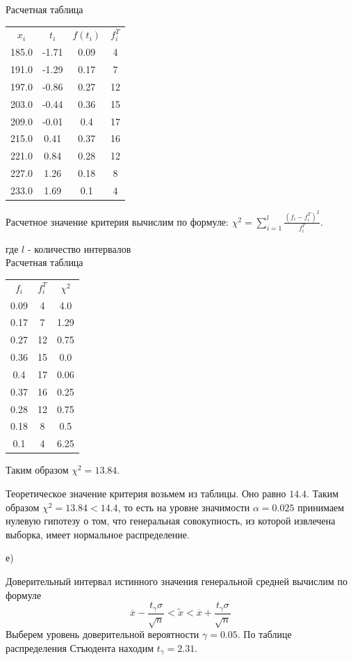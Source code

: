 \documentclass[10pt]{article}
\begin{document}
Расчетная таблица
\begin{center}
\begin{tabular}{ |c|c|c|c| }
\hline
$x_i$ & $t_i$ & $f(t_i)$ & $f_i^T$ \\
185.0 & -1.71 & 0.09 & 4 \\
191.0 & -1.29 & 0.17 & 7 \\
197.0 & -0.86 & 0.27 & 12 \\
203.0 & -0.44 & 0.36 & 15 \\
209.0 & -0.01 & 0.4 & 17 \\
215.0 & 0.41 & 0.37 & 16 \\
221.0 & 0.84 & 0.28 & 12 \\
227.0 & 1.26 & 0.18 & 8 \\
233.0 & 1.69 & 0.1 & 4 \\
\hline
\end{tabular}
\end{center}

Расчетное значение критерия вычислим по формуле:
$\chi^2=\sum_{i=1}^l\frac{(f_i-f^T_i)^2}{f_i^T}$.

где $l$ - количество интервалов\\

Расчетная таблица
\begin{center}
\begin{tabular}{ |c|c|c| }
\hline
$f_i$ & $f_i^T$ & $\chi^2$ \\
0.09 & 4 & 4.0 \\
0.17 & 7 & 1.29 \\
0.27 & 12 & 0.75 \\
0.36 & 15 & 0.0 \\
0.4 & 17 & 0.06 \\
0.37 & 16 & 0.25 \\
0.28 & 12 & 0.75 \\
0.18 & 8 & 0.5 \\
0.1 & 4 & 6.25 \\
\hline
\end{tabular}
\end{center}

Таким образом $\chi^2 = 13.84$.

Теоретическое значение критерия возьмем из таблицы. Оно равно $14.4$.
Таким образом $\chi ^ 2 = 13.84 < 14.4$, то есть на уровне значимости
$\alpha=0.025$ принимаем нулевую гипотезу о том, что генеральная совокупность,
из которой извлечена выборка, имеет нормальное распределение.

е)

Доверительный интервал истинного значения генеральной средней вычислим по формуле
\[\overline{x}-\frac{t_{\gamma}\sigma}{\sqrt{n}} < \tilde{x} <
\overline{x} + \frac{t_{\gamma}\sigma}{\sqrt{n}}\]
Выберем уровень доверительной вероятности $\gamma = 0.05$.
По таблице распределения Стъюдента находим $t_{\gamma}=2.31$.\\
\end{document}
